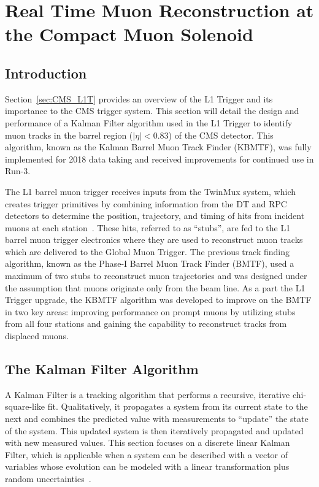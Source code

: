 
\chapter{Real Time Muon Reconstruction at the Compact Muon Solenoid}
\label{chap:kbmtf}

\section{Introduction} \label{sec:kbmtf_intro}
Section~\ref{sec:CMS_L1T} provides an overview of the L1 Trigger and its importance to the CMS trigger system. This section will detail the design and performance of a Kalman Filter algorithm used in the L1 Trigger to identify muon tracks in the barrel region ($|\eta|<0.83$) of the CMS detector. This algorithm, known as the Kalman Barrel Muon Track Finder (KBMTF), was fully implemented for 2018 data taking and received improvements for continued use in Run-3.

The L1 barrel muon trigger receives inputs from the TwinMux system, which creates trigger primitives by combining information from the DT and RPC detectors to determine the position, trajectory, and timing of hits from incident muons at each station~\cite{Triossi_2017}. These hits, referred to as ``stubs'', are fed to the L1 barrel muon trigger electronics where they are used to reconstruct muon tracks which are delivered to the Global Muon Trigger. The previous track finding algorithm, known as the Phase-I Barrel Muon Track Finder (BMTF), used a maximum of two stubs to reconstruct muon trajectories and was designed under the assumption that muons originate only from the beam line. As a part the L1 Trigger upgrade, the KBMTF algorithm was developed to improve on the BMTF in two key areas: improving performance on prompt muons by utilizing stubs from all four stations and gaining the capability to reconstruct tracks from displaced muons.

\section{The Kalman Filter Algorithm} \label{sec:kalman_filter}
A Kalman Filter is a tracking algorithm that performs a recursive, iterative chi-square-like fit. Qualitatively, it propagates a system from its current state to the next and combines the predicted value with measurements to ``update'' the state of the system. This updated system is then iteratively propagated and updated with new measured values. This section focuses on a discrete linear Kalman Filter, which is applicable when a system can be described with a vector of variables whose evolution can be modeled with a linear transformation plus random uncertainties~\cite{FRUHWIRTH1987444}.

